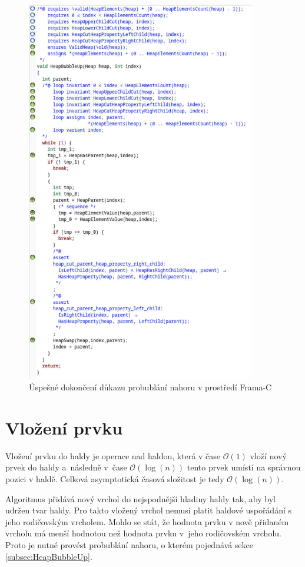 \begin{figure}[H]
	\centering
	\includegraphics[width=10cm]{images/frama-c-HeapBubbleUp}
	\caption{Úspešné dokončení důkazu probublání nahoru v prostředí Frama-C}
	\label{img:F-C-HeapBubbleUp}
\end{figure}

\section{Vložení prvku}
\label{subsec:HeapInsert}

Vložení prvku do haldy je operace nad haldou, která v čase $\mathcal{O}(1)$ vloží nový prvek do haldy a~následně v~čase $\mathcal{O}(\log(n))$ tento prvek umístí na správnou pozici v haldě. Celková asymptotická časová složitost je tedy $\mathcal{O}(\log(n))$.

Algoritmus přidává nový vrchol do nejspodnější hladiny haldy tak, aby byl udržen tvar haldy. Pro takto vložený vrchol nemusí platit haldové uspořádání s jeho rodičovským vrcholem. Mohlo se stát, že hodnota prvku v nově přidaném vrcholu má menší hodnotou než hodnota prvku v~jeho rodičovském vrcholu. Proto je nutné provést probublání nahoru, o kterém pojednává sekce \ref{subsec:HeapBubbleUp}.

